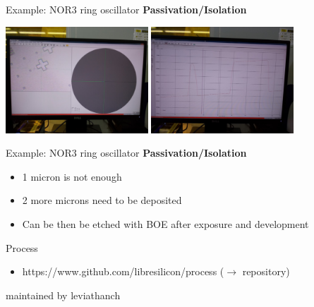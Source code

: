 \documentclass[aspectratio=169]{beamer}
\begin{document}
\begin{frame}{Example: NOR3 ring oscillator}
	\textbf{Passivation/Isolation}

	\begin{center}
		\includegraphics[width=0.4\textwidth]{images/20181220_124600.jpg}
		\includegraphics[width=0.4\textwidth]{images/20181220_124638_Burst01.jpg}
	\end{center}
\end{frame}

\begin{frame}{Example: NOR3 ring oscillator}
	\textbf{Passivation/Isolation}

	\begin{itemize}
		\item 1 micron is not enough
		\item 2 more microns need to be deposited
		\item Can be then be etched with BOE after exposure and development
	\end{itemize}
\end{frame}

\begin{frame}{Process}
	\begin{itemize}
        \setlength\itemsep{1em}
		\item https://www.github.com/libresilicon/process ($\rightarrow$ repository)
	\end{itemize}

maintained by leviathanch
\end{frame}


\section[Epilog]{}
\end{document}
